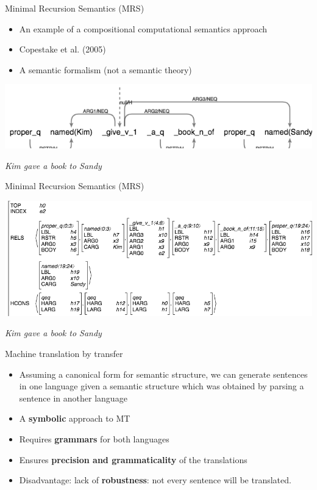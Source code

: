 \documentclass{beamer}
\begin{document}
\begin{frame}{Minimal Recursion Semantics (MRS)}
  \begin{itemize}
  \item An example of a compositional computational semantics approach
  \item Copestake et al. (2005)
  \item A semantic formalism (not a semantic theory)
  \end{itemize}

  \begin{center}
    \includegraphics[width=.8\textwidth]{figures/dmrs}
    
    {\it Kim gave a book to Sandy}
  \end{center}
\end{frame}

\begin{frame}{Minimal Recursion Semantics (MRS)}

  \includegraphics[width=\textwidth]{figures/mrs}

  \vspace{1cm}
  
  \centering
  {\it Kim gave a book to Sandy}
\end{frame}

\begin{frame}{Machine translation by transfer}
  \begin{itemize}
  \item Assuming a canonical form for semantic structure, we can generate sentences in one language given a semantic structure which was obtained by parsing a sentence in another language
  \item A {\bf symbolic} approach to MT
  \item Requires {\bf grammars} for both languages
  \item Ensures {\bf precision and grammaticality} of the translations
  \item Disadvantage: lack of {\bf robustness}: not every sentence will be translated.
  \end{itemize}
\end{frame}
\end{document}
